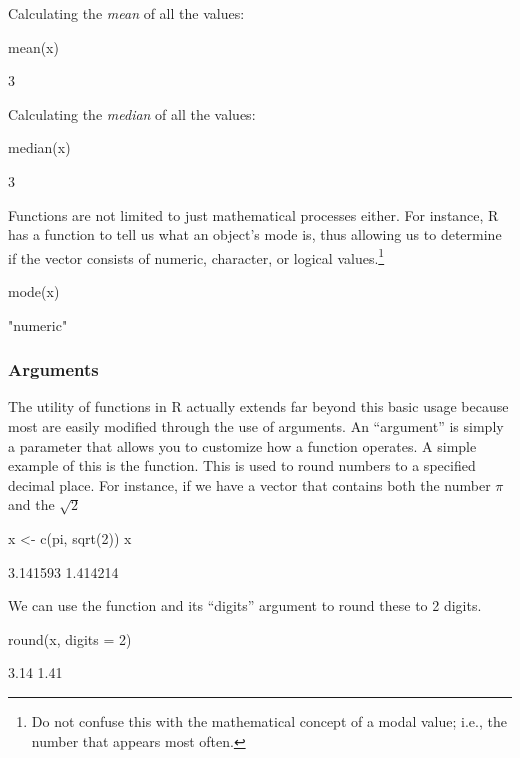 \noindent
Calculating the \textit{mean} of all the values:
\begin{inR}
mean(x)
\end{inR}
\begin{outR}
[1] 3
\end{outR}

\noindent
Calculating the \textit{median} of all the values:
\begin{inR}
median(x)
\end{inR}
\begin{outR}
[1] 3
\end{outR}

Functions are not limited to just mathematical processes either.  For instance, R has a function to tell us what an object's mode is, thus allowing us to determine if the vector consists of numeric, character, or logical values.\footnote{Do not confuse this with the mathematical concept of a modal value; i.e., the number that appears most often.}

\begin{inR}
mode(x)
\end{inR}
\begin{outR}
[1] "numeric"
\end{outR}

\subsubsection{Arguments}
\label{sec:func_args}

The utility of functions in R actually extends far beyond this basic usage because most are easily modified through the use of \glspl{argument}. An ``argument'' is simply a parameter that allows you to customize how a function operates. A simple example of this is the  function.  This is used to round numbers to a specified decimal place. For instance, if we have a vector that contains both the number $\pi$ and the $\sqrt{2}$

\begin{inR}
x <- c(pi, sqrt(2))
x
\end{inR}
\begin{outR}
[1] 3.141593 1.414214
\end{outR}

\noindent
We can use the  function and its ``digits'' argument to round these to 2 digits.
\begin{inR}
round(x, digits = 2)
\end{inR}
\begin{outR}
[1] 3.14 1.41
\end{outR}

